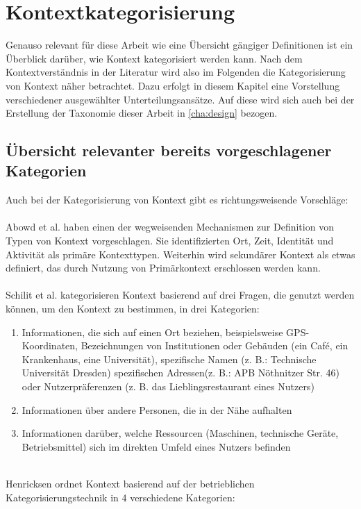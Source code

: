 \section{Kontextkategorisierung}
Genauso relevant für diese Arbeit wie eine Übersicht gängiger Definitionen ist ein Überblick darüber, wie Kontext kategorisiert werden kann. Nach dem Kontextverständnis in der Literatur wird also im Folgenden die Kategorisierung von Kontext näher betrachtet. Dazu erfolgt in diesem Kapitel eine Vorstellung verschiedener ausgewählter Unterteilungsansätze. Auf diese wird sich auch bei der Erstellung der Taxonomie dieser Arbeit in \ref{cha:design} bezogen.
\subsection{Übersicht  relevanter bereits vorgeschlagener Kategorien} 
Auch bei der Kategorisierung von Kontext gibt es richtungsweisende Vorschläge:\\\\ Abowd et al. \cite{abowd_towards_1999} haben einen der wegweisenden Mechanismen zur Definition von Typen von Kontext vorgeschlagen. Sie identifizierten Ort, Zeit, Identität und Aktivität als primäre Kontexttypen. Weiterhin wird sekundärer Kontext als etwas definiert, das durch Nutzung von Primärkontext erschlossen werden kann.\\\\ Schilit et al. \cite{schilit_context-aware_1994} kategorisieren Kontext basierend auf drei Fragen, die genutzt werden können, um den Kontext zu bestimmen, in drei Kategorien:
\begin{enumerate}
\item{Informationen, die sich auf einen Ort beziehen, beispielsweise GPS-Koordinaten, Bezeichnungen von Institutionen oder Gebäuden (ein Café, ein Krankenhaus, eine Universität), spezifische Namen (z. B.: Technische Universität Dresden) spezifischen Adressen(z. B.: APB Nöthnitzer Str. 46) oder Nutzerpräferenzen (z. B. das Lieblingsrestaurant eines Nutzers) }
\item{Informationen über andere Personen, die in der Nähe aufhalten}
\item{Informationen darüber, welche Ressourcen (Maschinen, technische Geräte, Betriebsmittel) sich im direkten Umfeld eines Nutzers befinden}
\end{enumerate}\\
Henricksen \cite{henricksen2003framework} ordnet Kontext basierend auf der betrieblichen Kategorisierungstechnik in 4 verschiedene Kategorien:
